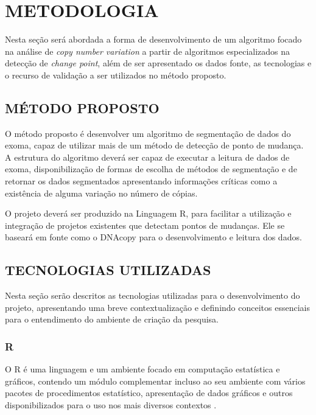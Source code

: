 
\chapter{METODOLOGIA}
\label{chap:metodologia}
Nesta seção será abordada a forma de desenvolvimento de um algoritmo focado na análise de \textit{copy number variation} a partir de algoritmos especializados na detecção de \textit{change point}, além de ser apresentado os dados fonte, as tecnologias e o recurso de validação a ser utilizados no método proposto. 

\section{MÉTODO PROPOSTO} 

O método proposto é desenvolver um algoritmo de segmentação de dados do exoma, capaz de utilizar mais de um método de detecção de ponto de mudança. A estrutura do algoritmo deverá ser capaz de executar a leitura de dados de exoma, disponibilização de formas de escolha de métodos de segmentação e de retornar os dados segmentados apresentando informações críticas como a existência de alguma variação no número de cópias.

O projeto deverá ser produzido na Linguagem R, para facilitar a utilização e integração de projetos existentes que detectam pontos de mudanças. Ele se baseará em fonte como o DNAcopy \cite{Olshen2004} para o desenvolvimento e leitura dos dados.

\section{TECNOLOGIAS UTILIZADAS}

Nesta seção serão descritos as tecnologias utilizadas para o desenvolvimento do projeto, apresentando uma breve contextualização e definindo conceitos essenciais para o entendimento do ambiente de criação da pesquisa.

\subsection{R}

O R \cite{Core2019} é uma linguagem e um ambiente focado em computação estatística e gráficos, contendo um módulo complementar incluso ao seu ambiente com vários pacotes de procedimentos estatístico, apresentação de dados gráficos e outros disponibilizados para o uso nos mais diversos contextos \cite{website:Hornik2018}.

